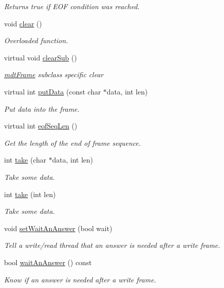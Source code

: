 \begin{DoxyCompactItemize}
\begin{DoxyCompactList}\small\item\em Returns true if EOF condition was reached. \end{DoxyCompactList}\item 
void \hyperlink{classmdt_frame_acdf8a921a3f36ca91af88b55b90febdc}{clear} ()
\begin{DoxyCompactList}\small\item\em Overloaded function. \end{DoxyCompactList}\item 
virtual void \hyperlink{classmdt_frame_aecc64d3846dee0049ee7b10b73a402f4}{clearSub} ()
\begin{DoxyCompactList}\small\item\em \hyperlink{classmdt_frame}{mdtFrame} subclass specific clear \end{DoxyCompactList}\item 
virtual int \hyperlink{classmdt_frame_ae63af784d2fc54430ea5db4dc80b7ec8}{putData} (const char $\ast$data, int len)
\begin{DoxyCompactList}\small\item\em Put data into the frame. \end{DoxyCompactList}\item 
virtual int \hyperlink{classmdt_frame_a0e0dcfb9d284ac0dae550db33f0fbece}{eofSeqLen} ()
\begin{DoxyCompactList}\small\item\em Get the length of the end of frame sequence. \end{DoxyCompactList}\item 
int \hyperlink{classmdt_frame_a36e4b85a3c671902ac3c8cc318ca726c}{take} (char $\ast$data, int len)
\begin{DoxyCompactList}\small\item\em Take some data. \end{DoxyCompactList}\item 
int \hyperlink{classmdt_frame_ad8b184e6eb07a26fe84deaf233c1aa9b}{take} (int len)
\begin{DoxyCompactList}\small\item\em Take some data. \end{DoxyCompactList}\item 
void \hyperlink{classmdt_frame_a3b9a331858df9061879592fab1b346f5}{setWaitAnAnswer} (bool wait)
\begin{DoxyCompactList}\small\item\em Tell a write/read thread that an answer is needed after a write frame. \end{DoxyCompactList}\item 
bool \hyperlink{classmdt_frame_ab27455f2fa3415a96482786c0ec27e55}{waitAnAnswer} () const 
\begin{DoxyCompactList}\small\item\em Know if an answer is needed after a write frame. \end{DoxyCompactList}\end{DoxyCompactItemize}
